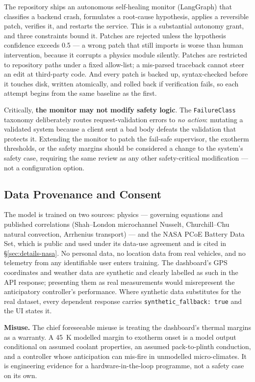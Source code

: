 \documentclass[journal,10pt,compsoc,onecolumn]{IEEEtran}
\begin{document}
\noindent
The repository ships an autonomous self-healing monitor (LangGraph) that
classifies a backend crash, formulates a root-cause hypothesis, applies a
reversible patch, verifies it, and restarts the service. This is a substantial
autonomy grant, and three constraints bound it. Patches are rejected unless the
hypothesis confidence exceeds \num{0.5} --- a wrong patch that still imports is
worse than human intervention, because it corrupts a physics module silently.
Patches are restricted to repository paths under a fixed allow-list; a
mis-parsed traceback cannot steer an edit at third-party code. And every patch is
backed up, syntax-checked before it touches disk, written atomically, and
rolled back if verification fails, so each attempt begins from the same baseline
as the first.

\noindent
Critically, \textbf{the monitor may not modify safety logic}. The
\texttt{FailureClass} taxonomy deliberately routes request-validation errors to
\emph{no action}: mutating a validated system because a client sent a bad body
defeats the validation that protects it. Extending the monitor to patch the
fail-safe supervisor, the exotherm thresholds, or the safety margins should be
considered a change to the system's safety case, requiring the same review as any
other safety-critical modification --- not a configuration option.

\subsection{Data Provenance and Consent}

\noindent
The model is trained on two sources: physics --- governing equations and
published correlations (Shah--London microchannel Nusselt, Churchill--Chu
natural convection, Arrhenius transport) --- and the NASA PCoE Battery Data Set,
which is public and used under its data-use agreement and is cited in
\S\ref{sec:details-nasa}. No personal data, no location data from real vehicles,
and no telemetry from any identifiable user enters training. The dashboard's GPS
coordinates and weather data are synthetic and clearly labelled as such in the
API response; presenting them as real measurements would misrepresent the
anticipatory controller's performance. Where synthetic data substitutes for the
real dataset, every dependent response carries
\texttt{synthetic\_fallback: true} and the UI states it.

\noindent
\textbf{Misuse.} The chief foreseeable misuse is treating the dashboard's
thermal margins as a warranty. A 45~K modelled margin to exotherm onset is a
model output conditional on assumed coolant properties, an assumed pack-to-plinth
conduction, and a controller whose anticipation can mis-fire in unmodelled
micro-climates. It is engineering evidence for a hardware-in-the-loop
programme, not a safety case on its own.
\end{document}
